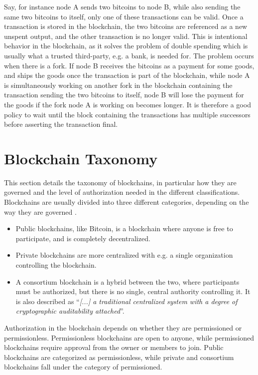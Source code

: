 Say, for instance node A sends two bitcoins to node B, while also sending the same two bitcoins to itself, only one of these transactions can be valid. Once a transaction is stored in the blockchain, the two bitcoins are referenced as a new unspent output, and the other transaction is no longer valid. This is intentional behavior in the blockchain, as it solves the problem of double spending which is usually what a trusted third-party, e.g. a bank, is needed for. The problem occurs when there is a fork. If node B receives the bitcoins as a payment for some goods, and ships the goods once the transaction is part of the blockchain, while node A is simultaneously working on another fork in the blockchain containing the transaction sending the two bitcoins to itself, node B will lose the payment for the goods if the fork node A is working on becomes longer. It is therefore a good policy to wait until the block containing the transactions has multiple successors before asserting the transaction final.


\section{Blockchain Taxonomy}
This section details the taxonomy of blockchains, in particular how they are governed and the level of authorization needed in the different classifications.
Blockchains are usually divided into three different categories, depending on the way they are governed \cite{Ethereum_pub_priv, taxonomy, Zheng_overview}.

\begin{itemize}
\item Public blockchains, like Bitcoin, is a blockchain where anyone is free to participate, and is completely decentralized.
\item Private blockchains are more centralized with e.g. a single organization controlling the blockchain.
\item A consortium blockchain is a hybrid between the two, where participants must be authorized, but there is no single, central authority controlling it. It is also described as \enquote{\textit{[...] a traditional centralized system with a degree of cryptographic auditability attached}}\cite{Ethereum_pub_priv}.
\end{itemize}

Authorization in the blockchain depends on whether they are  permissioned or permissionless. Permissionless blockchains are open to anyone, while permissioned blockchains require approval from the owner or members to join. Public blockchains are categorized as permissionless, while private and consortium blockchains fall under the category of permissioned.

